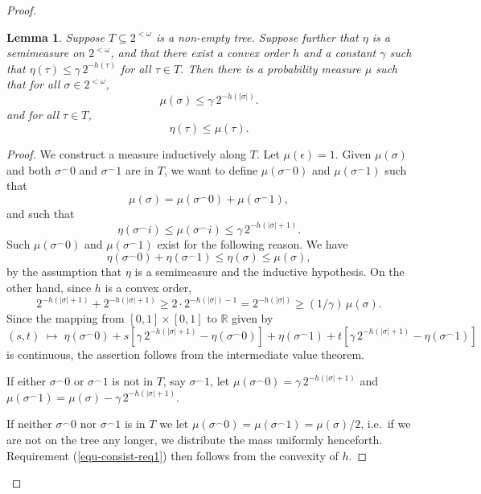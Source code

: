\documentclass[11pt,reqno]{article}
\theoremstyle{plain}
\newtheorem{lem}{Lemma}
\theoremstyle{definition}
\theoremstyle{remark}
\numberwithin{equation}{section}
\newcommand{\Real}{\ensuremath{\mathbb{R}}}
\newcommand{\Str}[1][<\omega]{\ensuremath{2^{#1}}}
\newcommand{\Conc}{\ensuremath{\mbox{}^\frown}}
\newcommand{\Estr}{\ensuremath{\epsilon}}
\begin{document}
\begin{proof}
	
	\begin{lem} \label{lem-meas-along-tree}
		Suppose $T \subseteq \Str$ is a non-empty tree. Suppose further that $\eta$ is a semimeasure on $\Str$, and that there exist a convex order $h$ and a constant $\gamma$ such that $\eta(\tau) \leq \gamma\, 2^{-h(\tau)}$ for all $\tau \in T$. Then there is a probability measure $\mu$ such that for all $\sigma \in \Str$,
	\begin{equation} \label{equ-consist-req1}
		\mu(\sigma) \leq \gamma \:2^{-h(|\sigma|)}.
	\end{equation}
	and for all $\tau \in T$, 
	\begin{equation} \label{equ-consist-req2}
		\eta(\tau) \leq \mu(\tau). 
	\end{equation}	
	\end{lem}
	
	\begin{proof}
		We construct a measure inductively along $T$. Let $\mu(\Estr) = 1$. Given $\mu(\sigma)$ and both $\sigma\Conc 0$ and $\sigma\Conc 1$ are in $T$, we want to define $\mu(\sigma \Conc 0)$ and $\mu(\sigma \Conc 1)$ such that
		\[
			\mu(\sigma) = \mu(\sigma \Conc 0) + \mu(\sigma \Conc 1),
		\]
		and such that
		\[
			\eta(\sigma \Conc i) \leq \mu(\sigma \Conc i) \leq \gamma\, 2^{-h(|\sigma|+1)}.
		\]
		Such $\mu(\sigma \Conc 0)$ and $\mu(\sigma \Conc 1)$ exist for the following reason. We have
		\[
			\eta(\sigma\Conc 0) + \eta(\sigma\Conc 1) \leq \eta(\sigma) \leq \mu(\sigma),
		\] 
		by the assumption that $\eta$ is a semimeasure and the inductive hypothesis. 
		On the other hand, since $h$ is a convex order,
		\[
			2^{-h(|\sigma|+1)} + 2^{-h(|\sigma|+1)} \geq 2\cdot 2^{-h(|\sigma|)-1} = 2^{-h(|\sigma|)} \geq (1/\gamma)\,\mu(\sigma).
		\]
		Since the mapping from $[0,1]\times [0,1]$ to $\Real$ given by 
		\[
			(s,t) \; \mapsto \; \eta(\sigma\Conc 0) + s[\gamma\, 2^{-h(|\sigma|+1)} - \eta(\sigma\Conc 0)] + \eta(\sigma\Conc 1) + t[\gamma\, 2^{-h(|\sigma|+1)} - \eta(\sigma\Conc 1)]
		\]
		is continuous, the assertion follows from the intermediate value theorem.
		
		
	 	If either $\sigma\Conc 0$ or $\sigma\Conc 1$ is not in $T$, say $\sigma\Conc 1$, let $\mu(\sigma \Conc 0) = \gamma\, 2^{-h(|\sigma|+1)}$ and $\mu(\sigma \Conc 1) = \mu(\sigma) - \gamma\, 2^{-h(|\sigma|+1)}$.
	
	 	If neither $\sigma\Conc 0$ nor $\sigma\Conc 1$ is  in $T$ we let $\mu(\sigma\Conc 0) = \mu(\sigma\Conc 1) = \mu(\sigma)/2$, i.e.\ if we are not on the tree any longer, we distribute the mass uniformly henceforth. Requirement (\ref{equ-consist-req1}) then follows from the convexity of $h$.
	 \end{proof}


\end{proof}
\end{document}
